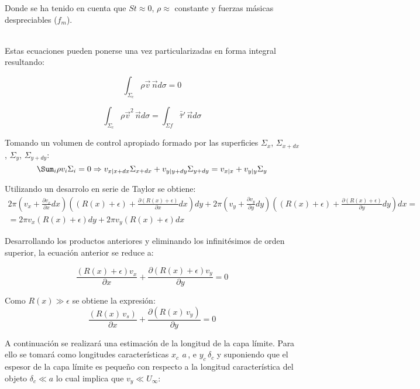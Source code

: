 \documentclass[11pt,a4paper]{article}
\begin{document}
Donde se ha tenido en cuenta que $St \approx 0$, $\rho \approx$ constante y fuerzas másicas despreciables ($f_{m}$).

\\

Estas ecuaciones pueden ponerse una vez particularizadas en forma integral resultando:

\[\int_{\Sigma_{c}} \rho \vec{v} \, \vec{n} d\sigma=0\]

\[\int_{\Sigma_{c}} \rho \vec{v}^{2} \, \vec{n} d\sigma = \int_{\Sigma{f}} \bar{\bar{\tau}}' \,  \vec{n} d\sigma\]

Tomando un volumen de control apropiado formado por las superficies $\Sigma_{x}$, $\Sigma_{x+dx}$, $\Sigma_{y}$, $\Sigma_{y+dy}$:
\[\Sum_{i} \rho v_{i} \Sigma_{i}= 0 \Rightarrow v_{x|x+dx} \Sigma_{x+dx} + v_{y|y+dy} \Sigma_{y+dy}=v_{x|x} + v_{y|y} \Sigma_{y}\]

Utilizando un desarrolo en serie de Taylor se obtiene:
\begin{multline*}
\displaystyle 2\pi\left(  v_{x} + \frac{\partial v_{x}}{\partial{x}}dx\right) \left( (R(x) + \epsilon)+\frac{\partial(R(x)+\epsilon)}{\partial{x}}dx \right) dy + 2\pi \left( v_{y} + \frac{\partial{v_{y}}}{\partial{y}} dy \right) \left( (R(x)+\epsilon) + \frac{\partial(R(x)+\epsilon)}{\partial y} dy \right) dx= \\=
2\pi v_{x}( R(x)+\epsilon)dy + 2\pi v_{y}(R(x)+\epsilon)dx
\end{multline*} 

Desarrollando los productos anteriores y eliminando los infinitésimos de orden superior, la ecuación anterior se reduce a:

\[\frac{(R(x)+\epsilon) v_{x}}{\partial {x}} + \frac{\partial(R(x) + \epsilon) v_{y}}{\partial y}=0\]

Como $R(x) \gg \epsilon$ se obtiene la expresión:
\[\frac{(R(x)\, v_{s})}{\partial x} + \frac{\partial (R(x)\, v_{y})}{\partial y}=0\]


\vspace{0.5cm}

A continuación se realizará una estimación de la longitud de la capa límite. Para ello se tomará como longitudes características $x_{c}\,~a\,$, e $y_{c}\, \delta_{c}$ y suponiendo que el espesor de la capa límite es pequeño con respecto a la longitud característica del objeto $\delta_{c} \ll a$ lo cual implica que $v_{y} \ll U_{\infty}$:
\end{document}
